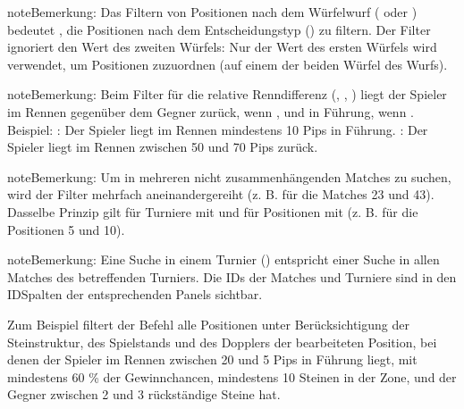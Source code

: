\documentclass[letterpaper,10pt,german]{sphinxmanual}
\begin{document}
\begin{sphinxadmonition}{note}{Bemerkung:}
\sphinxAtStartPar
Das Filtern von Positionen nach dem Würfelwurf ( oder ) bedeutet , die Positionen nach dem Entscheidungstyp () zu filtern. Der Filter  ignoriert den Wert des zweiten Würfels: Nur der Wert des ersten Würfels wird verwendet, um Positionen zuzuordnen (auf einem der beiden Würfel des Wurfs).
\end{sphinxadmonition}

\begin{sphinxadmonition}{note}{Bemerkung:}
\sphinxAtStartPar
Beim Filter für die relative Renndifferenz (, , ) liegt der Spieler im Rennen gegenüber dem Gegner zurück, wenn , und in Führung, wenn . Beispiel: : Der Spieler liegt im Rennen mindestens 10 Pips in Führung. : Der Spieler liegt im Rennen zwischen 50 und 70 Pips zurück.
\end{sphinxadmonition}

\begin{sphinxadmonition}{note}{Bemerkung:}
\sphinxAtStartPar
Um in mehreren nicht zusammenhängenden Matches zu suchen, wird der Filter  mehrfach aneinandergereiht (z. B.  für die Matches 23 und 43). Dasselbe Prinzip gilt für Turniere mit  und für Positionen mit  (z. B.  für die Positionen 5 und 10).
\end{sphinxadmonition}

\begin{sphinxadmonition}{note}{Bemerkung:}
\sphinxAtStartPar
Eine Suche in einem Turnier () entspricht einer Suche in allen Matches des betreffenden Turniers. Die IDs der Matches und Turniere sind in den ID\sphinxhyphen{}Spalten der entsprechenden Panels sichtbar.
\end{sphinxadmonition}

\sphinxAtStartPar
Zum Beispiel filtert der Befehl  alle Positionen unter Berücksichtigung der Steinstruktur, des Spielstands und des Dopplers der bearbeiteten Position, bei denen der Spieler im Rennen zwischen 20 und 5 Pips in Führung liegt, mit mindestens 60 \% der Gewinnchancen, mindestens 10 Steinen in der Zone, und der Gegner zwischen 2 und 3 rückständige Steine hat.
\end{document}
